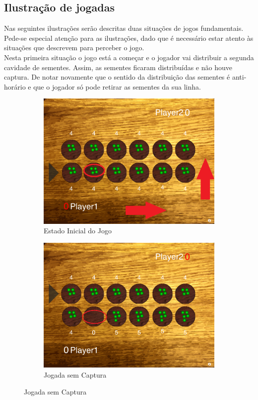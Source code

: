 \documentclass[15pt,a4paper]{article}
\begin{document}
\subsection{Ilustração de jogadas}
Nas seguintes ilustrações serão descritas duas situações de jogos fundamentais. Pede-se especial atenção para as ilustrações, dado que é necessário estar atento às situações que descrevem para perceber o jogo.\\
\indent Nesta primeira situação o jogo está a começar e o jogador vai distribuir a segunda cavidade de sementes. Assim, as sementes ficaram distribuídas e não houve captura. De notar novamente que o sentido da distribuição das sementes é anti-horário e que o jogador só pode retirar as sementes da sua linha.
\begin{figure} [H]
        \centering
        \begin{subfigure}[f]{0.3\textwidth}
                \centering
                \includegraphics[scale=0.2]{iniciodoJogo.png}
				\caption{Estado Inicial do Jogo}
                \label{fig:inicioJogo}
        \end{subfigure}%
        \quad  \quad
        \begin{subfigure}[f]{0.3\textwidth}
                \centering
                \includegraphics[scale=0.2]{semCaptura.png}
				\caption{Jogada sem Captura}
				\label{fig:semCaptura}
        \end{subfigure}
\end{figure}
\end{document}

